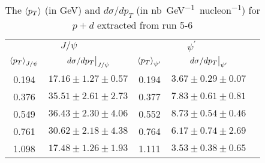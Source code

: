 \documentclass[../main.tex]{subfiles}
\begin{document}
\begin{table}[h!]
	\centering
	\caption{The $\expval{p_T}$ (in \unit{\GeV}) and  $d\sigma/dp_T$ (in \unit{\nano\barn\GeV^{-1} nucleon^{-1}}) for $p+d$ extracted from run 5-6}
	\begin{tabular}{cc|ccc}
		\hline
		\multicolumn{2}{c|}{$J/\psi$} & \multicolumn{2}{c}{$\psi^{\prime}$} &                                                                      \\ \cline{1-4}
		$\expval{p_T}_{J/\psi} $       & $\eval{d\sigma/dp_T}_{J/\psi}$      & $\expval{p_T}_{\psi^\prime}$ & $\eval{d\sigma/dp_T}_{\psi^\prime}$ & \\ \cline{1-4}
		\multicolumn{1}{c|}{0.194}    & $17.16\pm1.27\pm0.57$               & \multicolumn{1}{c|}{0.194}   & $3.67\pm0.29\pm0.07$                & \\
		\multicolumn{1}{c|}{0.376}    & $35.51\pm2.61\pm2.73$               & \multicolumn{1}{c|}{0.377}   & $7.83\pm0.61\pm0.81$                & \\
		\multicolumn{1}{c|}{0.549}    & $36.43\pm2.30\pm4.06$               & \multicolumn{1}{c|}{0.552}   & $8.73\pm0.54\pm0.46$                & \\
		\multicolumn{1}{c|}{0.761}    & $30.62\pm2.18\pm4.38$               & \multicolumn{1}{c|}{0.764}   & $6.17\pm0.74\pm2.69$                & \\
		\multicolumn{1}{c|}{1.098}    & $17.48\pm1.26\pm1.93$               & \multicolumn{1}{c|}{1.111}   & $3.53\pm0.38\pm0.65$                & \\ \cline{1-4}
	\end{tabular}
\end{table}
\end{document}
